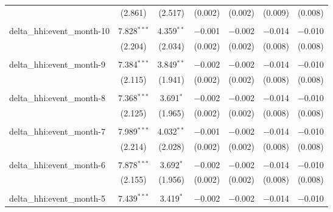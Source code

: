 \begin{table}[H]
{\begin{tabular}{@{\extracolsep{5pt}}lcccccc}
   & (2.861) & (2.517) & (0.002) & (0.002) & (0.009) & (0.008) \\  

   & & & & & & \\  

  delta\_hhi:event\_month-10 & 7.828$^{***}$ & 4.359$^{**}$ & $-$0.001 & $-$0.002 & $-$0.014 & $-$0.010 \\  

   & (2.204) & (2.034) & (0.002) & (0.002) & (0.008) & (0.008) \\  

   & & & & & & \\  

  delta\_hhi:event\_month-9 & 7.384$^{***}$ & 3.849$^{**}$ & $-$0.002 & $-$0.002 & $-$0.014 & $-$0.010 \\  

   & (2.115) & (1.941) & (0.002) & (0.002) & (0.008) & (0.008) \\  

   & & & & & & \\  

  delta\_hhi:event\_month-8 & 7.368$^{***}$ & 3.691$^{*}$ & $-$0.002 & $-$0.002 & $-$0.014 & $-$0.010 \\  

   & (2.125) & (1.965) & (0.002) & (0.002) & (0.008) & (0.008) \\  

   & & & & & & \\  

  delta\_hhi:event\_month-7 & 7.989$^{***}$ & 4.032$^{**}$ & $-$0.001 & $-$0.002 & $-$0.014 & $-$0.010 \\  

   & (2.214) & (2.028) & (0.002) & (0.002) & (0.008) & (0.008) \\  

   & & & & & & \\  

  delta\_hhi:event\_month-6 & 7.878$^{***}$ & 3.692$^{*}$ & $-$0.002 & $-$0.002 & $-$0.014 & $-$0.010 \\  

   & (2.155) & (1.956) & (0.002) & (0.002) & (0.008) & (0.008) \\  

   & & & & & & \\  

  delta\_hhi:event\_month-5 & 7.439$^{***}$ & 3.419$^{*}$ & $-$0.002 & $-$0.002 & $-$0.014 & $-$0.010 \\  


\end{tabular}}
\end{table}
